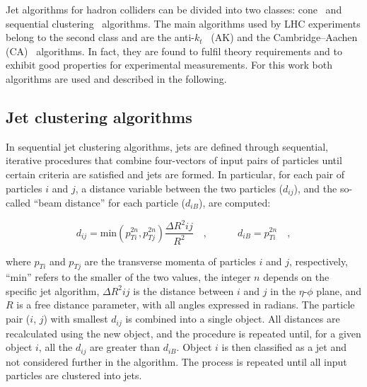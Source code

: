 Jet algorithms for hadron colliders can be divided into two classes: cone~\cite{Salam:2007xv} and sequential clustering~\cite{Catani:1993hr,Ellis:1993tq,Dokshitzer:1997in,Wobisch:1998wt,Cacciari:2008gp} algorithms.
The main algorithms used by LHC experiments belong to the second class and are the anti-$k_t$~\cite{Cacciari:2008gp} (AK) and the Cambridge--Aachen (CA)~\cite{Catani:1993hr,Dokshitzer:1997in} algorithms. In fact, they are found to fulfil theory requirements and to exhibit good properties for experimental measurements. For this work both algorithms are used and described in the following.
 
\subsection{Jet clustering algorithms}\label{subsec:jetsalgo}

In sequential jet clustering algorithms, jets are defined through sequential, iterative procedures that combine four-vectors of input pairs of particles until certain criteria are satisfied and jets are formed. In particular, for each pair of particles $i$ and $j$, a distance variable between the two particles ($d_{ij}$), and the so-called ``beam distance'' for each particle ($d_{iB}$), are computed:
 
\begin{equation}\label{eqn:jetalgo}
d_{ij} = \mathrm{min}(p_{Ti}^{2n},p_{Tj}^{2n})\frac{\Delta R^2{ij}}{R^2}\quad,\quad\quad\quad
d_{iB} = p_{Ti}^{2n}\quad,
\end{equation} 

where $p_{Ti}$ and $p_{Tj}$ are the transverse momenta of particles $i$ and $j$, respectively, ``min'' refers to the smaller of the two \pt values, the integer $n$ depends on the specific jet algorithm, $\Delta R^2{ij}$ is the distance between $i$ and $j$ in the $\eta$-$\phi$ plane, and $R$ is a free distance parameter, with all angles expressed in radians. The particle pair ($i$, $j$) with smallest $d_{ij}$ is combined into a single object. All distances are recalculated using the new object, and the procedure is repeated until, for a given object $i$, all the $d_{ij}$ are greater than $d_{iB}$. Object $i$ is then classified as a jet and not considered further in the algorithm. The process is repeated until all input particles are clustered into jets.

